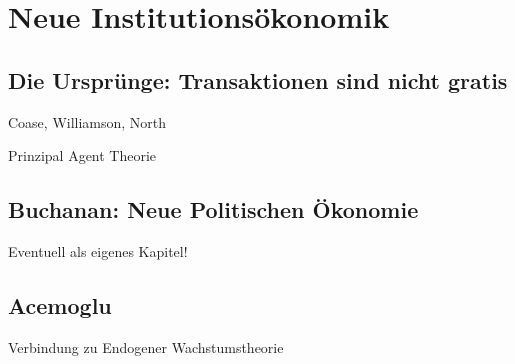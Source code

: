 %
%
%

\chapter{Neue Institutionsökonomik}
\label{Neue Institut}

\section{Die Ursprünge: Transaktionen sind nicht gratis} \label{sec: Neue Inst}
Coase, Williamson, North

Prinzipal Agent Theorie



\section{Buchanan: Neue Politischen Ökonomie}

Eventuell als eigenes Kapitel!

\section{Acemoglu}
Verbindung zu Endogener Wachstumstheorie